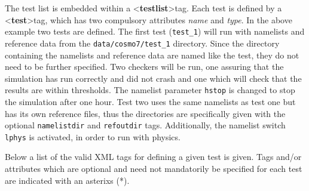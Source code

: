 \documentclass[12pt,twoside,a4paper]{report}
\newcommand{\tl}{\textless}
\newcommand{\tg}{\textgreater}
\newcommand{\tbf}{\textbf}
\newcommand{\tit}{\textit}
\newcommand{\hs}{\hspace{1mm}}
\begin{document}
The test list is embedded within a \tl \tbf{testlist}\tg \hs tag. Each test is defined by a \tl \tbf{test}\tg  \hs tag, which has two compulsory attributes \tit{name} and \tit{type}. In the above example two tests are defined. The first test (\texttt{test\_1}) will run with namelists and reference data from the \texttt{data/cosmo7/test\_1} directory. Since the directory containing the namelists and reference data are named like the test, they do not need to be further specified. Two checkers will be run, one assuring that the simulation has run correctly and did not crash and one which will check that the results are within thresholds. The namelist parameter \texttt{hstop} is changed to stop the simulation after one hour. Test two uses the same namelists as test one but has its own reference files, thus the directories are specifically given with the optional \texttt{namelistdir} and \texttt{refoutdir} tags. Additionally, the namelist switch \texttt{lphys} is activated, in order to run with physics.

Below a list of the valid XML tags for defining a given test is given. Tags and/or attributes which are optional and need not mandatorily be specified for each test are indicated with an asterixs (*).\\
\end{document}
